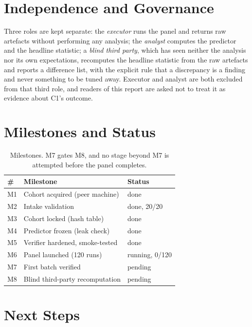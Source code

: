 \documentclass[conference]{IEEEtran}
\begin{document}
\section{Independence and Governance}
\label{sec:gov}

Three roles are kept separate: the \emph{executor} runs the panel and returns raw artefacts without
performing any analysis; the \emph{analyst} computes the predictor and the headline statistic; a
\emph{blind third party}, which has seen neither the analysis nor its own expectations, recomputes
the headline statistic from the raw artefacts and reports a difference list, with the explicit rule
that a discrepancy is a finding and never something to be tuned away. Executor and analyst are both
excluded from that third role, and readers of this report are asked not to treat it as evidence
about C1's outcome.

\section{Milestones and Status}
\label{sec:mil}

\begin{table}[!t]
\centering
\footnotesize
\setlength{\tabcolsep}{3pt}
\begin{tabular}{@{}p{}p{}p{}@{}}
\toprule
\# & Milestone & Status \\
\midrule
M1 & Cohort acquired (peer machine) & done \\
M2 & Intake validation & done, 20/20 \\
M3 & Cohort locked (hash table) & done \\
M4 & Predictor frozen (leak check) & done \\
M5 & Verifier hardened, smoke-tested & done \\
M6 & Panel launched (120 runs) & running, 0/120 \\
M7 & First batch verified & pending \\
M8 & Blind third-party recomputation & pending \\
\bottomrule
\end{tabular}
\caption{Milestones. M7 gates M8, and no stage beyond M7 is attempted before the panel completes.}
\label{tab:mil}
\end{table}

\section{Next Steps}
\label{sec:next}
\end{document}
